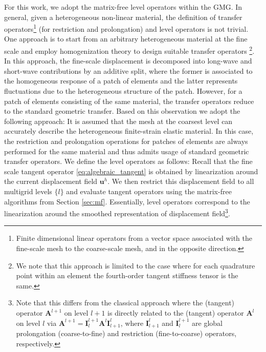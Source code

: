 \documentclass[times,doublespace]{nmeauth}
\def\gz  #1{           \mbox{$\boldsymbol{#1}$}}
\begin{document}
For this work, we adopt the matrix-free level operators within the GMG.
In general, given a heterogeneous non-linear material, the definition of transfer operators\footnote{Finite dimensional linear operators from a vector space associated with the fine-scale mesh to the coarse-scale mesh, and in the opposite direction.} (for restriction and prolongation) and level operators is not trivial. One approach is to start from an arbitrary heterogeneous material at the fine scale and employ homogenization theory \cite{Suquet1987, Hill1972,Hashin1983,Castaneda1997} to design suitable transfer operators \cite{Miehe2007}\footnote{
  We note that this approach is limited to the case where for each quadrature point within an element the fourth-order tangent stiffness tensor is the same.
}.
In this approach, the fine-scale displacement is decomposed into long-wave and short-wave contributions by an additive split, where the former is associated to the homogeneous response of a patch of elements and the latter represents fluctuations due to the heterogeneous structure of the patch.
However, for a patch of elements consisting of the same material, the transfer operators reduce to the standard geometric transfer.
Based on this observation we adopt the following approach: It is assumed that the mesh at the coarsest level can accurately describe the heterogeneous finite-strain elastic material.
In this case, the restriction and prolongation operations for patches of elements are always performed for the same material and thus admits usage of standard geometric transfer operators.
We define the level operators as follows: Recall that the fine scale tangent operator \eqref{eq:algebraic_tangent} is obtained by linearization around the current displacement field $\gz u^h$. We then restrict this displacement field to all multigrid levels $\{l\}$ and evaluate tangent operators using the matrix-free algorithms from Section \ref{sec:mf}.
Essentially, level operators correspond to the linearization around the smoothed representation of displacement field\footnote{
Note that this differs from the classical approach where the (tangent) operator $\gz A^{l+1}$ on level $l+1$ is directly related to the (tangent) operator $\gz A^{l}$ on level $l$ via $\gz A^{l+1}=\gz I^{l+1}_{l} \gz A^l \gz I^l_{l+1}$, where $\gz I^l_{l+1}$ and $\gz I^{l+1}_l$ are global prolongation (coarse-to-fine) and restriction (fine-to-coarse) operators, respectively.
}.
\end{document}
